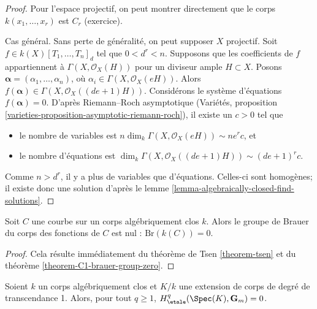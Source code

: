\begin{proof}
Pour l'espace projectif, on peut montrer directement que le corps
$k(x_1, \ldots, x_r)$ est $C_r$ (exercice).

\medskip\noindent
Cas général. Sans perte de généralité, on peut supposer $X$ projectif.
Soit $f \in k(X)[T_1, \ldots, T_n]_d$ tel que $0 < d^r < n$.
Supposons que les coefficients de $f$ appartiennent à $\Gamma(X, \mathcal{O}_X(H))$
pour un diviseur ample $H \subset X$. Posons
$\mathbf{\alpha} = (\alpha_1, \ldots, \alpha_n)$, où $\alpha_i \in \Gamma(X,
\mathcal{O}_X(eH))$. Alors $f(\mathbf{\alpha}) \in \Gamma(X,
\mathcal{O}_X((de + 1)H))$. Considérons le système d'équations $f(\mathbf{\alpha})
=0$. D'après Riemann--Roch asymptotique
(Variétés, proposition \ref{varieties-proposition-asymptotic-riemann-roch}),
il existe un $c > 0$ tel que
\begin{itemize}
\item le nombre de variables est
$n\dim_k \Gamma(X, \mathcal{O}_X(eH)) \sim n e^r c$, et
\item le nombre d'équations est
$\dim_k \Gamma(X, \mathcal{O}_X((de + 1)H)) \sim (de + 1)^r c$.
\end{itemize}
Comme $n > d^r$, il y a plus de variables que d'équations. Celles-ci sont
homogènes; il existe donc une solution d'après le
lemme \ref{lemma-algebraically-closed-find-solutions}.
\end{proof}

\begin{lemma}
\label{lemma-curve-brauer-zero}
Soit $C$ une courbe sur un corps algébriquement clos $k$. Alors
le groupe de Brauer du corps des fonctions de $C$ est nul :
$\text{Br}(k(C)) = 0$.
\end{lemma}

\begin{proof}
Cela résulte immédiatement du théorème de Tsen
\ref{theorem-tsen} et du
théorème \ref{theorem-C1-brauer-group-zero}.
\end{proof}

\begin{lemma}
\label{lemma-cohomology-Gm-function-field-curve}
Soient $k$ un corps algébriquement clos et $K/k$ une extension de corps
de degré de transcendance 1. Alors, pour tout $q \geq 1$,
$H_\etale^q(\Spec(K), \mathbf{G}_m) = 0$.
\end{lemma}

